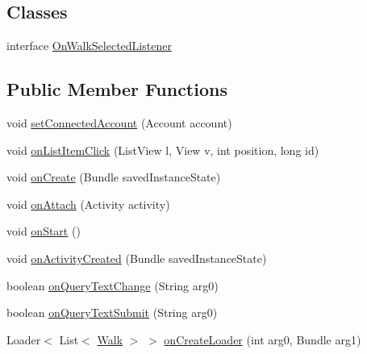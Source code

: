 \subsection*{Classes}
\begin{DoxyCompactItemize}
\item 
interface \hyperlink{interfaceuk_1_1ac_1_1swan_1_1digitaltrails_1_1fragments_1_1_search_list_fragment_1_1_on_walk_selected_listener}{On\+Walk\+Selected\+Listener}
\end{DoxyCompactItemize}
\subsection*{Public Member Functions}
\begin{DoxyCompactItemize}
\item 
void \hyperlink{classuk_1_1ac_1_1swan_1_1digitaltrails_1_1fragments_1_1_search_list_fragment_a651ae8e3989711305e05234001833c98}{set\+Connected\+Account} (Account account)
\item 
void \hyperlink{classuk_1_1ac_1_1swan_1_1digitaltrails_1_1fragments_1_1_search_list_fragment_a99d0ec023b97f6b1acb23672cc2f2fd0}{on\+List\+Item\+Click} (List\+View l, View v, int position, long id)
\item 
void \hyperlink{classuk_1_1ac_1_1swan_1_1digitaltrails_1_1fragments_1_1_search_list_fragment_ae367691061b9823c1f3aedbaf41daa8a}{on\+Create} (Bundle saved\+Instance\+State)
\item 
void \hyperlink{classuk_1_1ac_1_1swan_1_1digitaltrails_1_1fragments_1_1_search_list_fragment_a707f084f0b97245c41d13d0b39c9ddaa}{on\+Attach} (Activity activity)
\item 
void \hyperlink{classuk_1_1ac_1_1swan_1_1digitaltrails_1_1fragments_1_1_search_list_fragment_a83b95e68e47d20ab3cd67629c7a2913e}{on\+Start} ()
\item 
void \hyperlink{classuk_1_1ac_1_1swan_1_1digitaltrails_1_1fragments_1_1_search_list_fragment_aa2d8d74a20906f3e867d6f12d844a1c8}{on\+Activity\+Created} (Bundle saved\+Instance\+State)
\item 
boolean \hyperlink{classuk_1_1ac_1_1swan_1_1digitaltrails_1_1fragments_1_1_search_list_fragment_a07ed2e92f5eaac71811d577adf951946}{on\+Query\+Text\+Change} (String arg0)
\item 
boolean \hyperlink{classuk_1_1ac_1_1swan_1_1digitaltrails_1_1fragments_1_1_search_list_fragment_a99427567325cd749e9db66ac5938fa0c}{on\+Query\+Text\+Submit} (String arg0)
\item 
Loader$<$ List$<$ \hyperlink{classuk_1_1ac_1_1swan_1_1digitaltrails_1_1components_1_1_walk}{Walk} $>$ $>$ \hyperlink{classuk_1_1ac_1_1swan_1_1digitaltrails_1_1fragments_1_1_search_list_fragment_af8effedd4abdc7831f8cf8fde82bad3c}{on\+Create\+Loader} (int arg0, Bundle arg1)

\end{DoxyCompactItemize}
